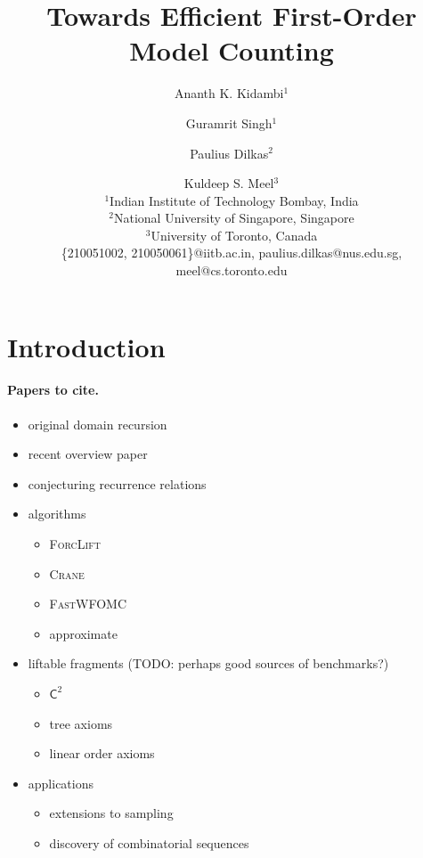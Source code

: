 \documentclass{article}
\title{Towards Efficient First-Order Model Counting}
\author{%
Ananth K. Kidambi$^1$\and
Guramrit Singh$^1$\and
Paulius Dilkas$^2$\and
Kuldeep S. Meel$^3$ \\
\affiliations
$^1$Indian Institute of Technology Bombay, India\\
$^2$National University of Singapore, Singapore\\
$^3$University of Toronto, Canada\\
\emails
\{210051002, 210050061\}@iitb.ac.in,
paulius.dilkas@nus.edu.sg,
meel@cs.toronto.edu
}
\theoremstyle{definition}
\newcommand{\Ctwo}{$\mathsf{C}^{2}$}
\begin{document}
\maketitle

\begin{abstract}
\end{abstract}

\section{Introduction}


\paragraph{Papers to cite.}
\begin{itemize}
  \item original domain recursion~\cite{DBLP:conf/nips/Broeck11}
  \item recent overview paper~\cite{DBLP:conf/ijcai/Kuzelka23}
  \item conjecturing recurrence relations~\cite{DBLP:conf/ilp/BarvinekB0ZK21}
  \item algorithms
  \begin{itemize}
    \item \textsc{ForcLift}~\cite{DBLP:conf/ijcai/BroeckTMDR11}
    \item \textsc{Crane}~\cite{DBLP:conf/kr/DilkasB23}
    \item \textsc{FastWFOMC}~\cite{DBLP:conf/uai/BremenK21}
    \item approximate~\cite{DBLP:conf/ijcai/BremenK20}
  \end{itemize}
  \item liftable fragments (TODO: perhaps good sources of benchmarks?)
  \begin{itemize}
    \item \Ctwo~\cite{DBLP:journals/jair/Kuzelka21}
    \item tree axioms~\cite{DBLP:journals/ai/BremenK23}
    \item linear order axioms~\cite{DBLP:conf/aaai/TothK23}
  \end{itemize}
  \item applications
  \begin{itemize}
    \item extensions to
          sampling~\cite{DBLP:conf/aaai/WangB0K22,DBLP:conf/lics/WangP0K23}
    \item discovery of combinatorial
          sequences~\cite{DBLP:conf/ijcai/SvatosJT0K23}
  \end{itemize}
\end{itemize}
\end{document}
